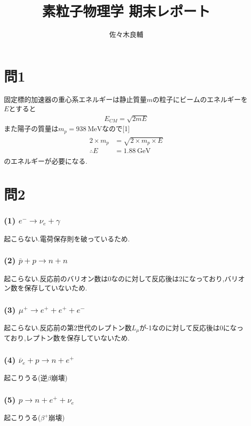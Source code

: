 \documentclass[uplatex,a4j,11pt,dvipdfmx]{jsarticle}
\begin{document}
\title{素粒子物理学 期末レポート}
\author{佐々木良輔}
\date{}
\maketitle
\section*{問1}
固定標的加速器の重心系エネルギーは静止質量$m$の粒子にビームのエネルギーを$E$とすると
\begin{align}
  E_{CM}=\sqrt{2mE}
\end{align}
また陽子の質量は$m_p=938\ \si{\mega\electronvolt}$なので[1]
\begin{align}
  \begin{split}
    2\times m_p&=\sqrt{2\times m_p\times E}\\
    \therefore E&=1.88\ \si{\giga\electronvolt}
  \end{split}
\end{align}
のエネルギーが必要になる.
\section*{問2}
\subsubsection*{(1) $e^-\rightarrow\nu_e+\gamma$}
起こらない.電荷保存則を破っているため.
\subsubsection*{(2) $\overline{p}+p\rightarrow n+n$}
起こらない.反応前のバリオン数は0なのに対して反応後は2になっており,バリオン数を保存していないため.
\subsubsection*{(3) $\mu^+\rightarrow e^++e^++e^-$}
起こらない.反応前の第2世代のレプトン数$L_\mu$が-1なのに対して反応後は0になっており,レプトン数を保存していないため.
\subsubsection*{(4) $\overline{\nu}_e+p\rightarrow n+e^+$}
起こりうる(逆$\beta$崩壊)
\subsubsection*{(5) $p\rightarrow n+e^++\nu_e$}
起こりうる($\beta^+$崩壊)
\end{document}
